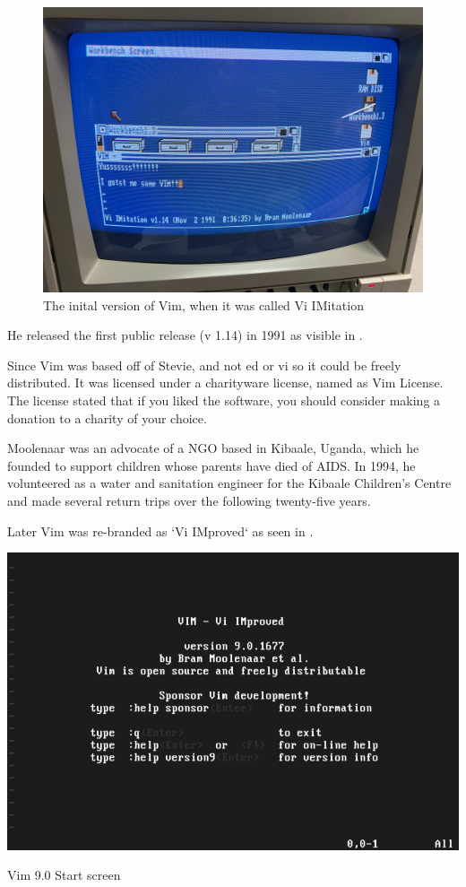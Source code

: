 \begin{figure}[h!]
  \includegraphics[width=0.8\linewidth]{images/png/vim-amiga.png}
  \caption{The inital version of Vim, when it was called Vi IMitation}
\end{figure}

He released the first public release (v 1.14) in 1991
as visible in .

Since Vim was based off of Stevie, and not ed or vi
so it could be freely distributed.
It was licensed under a charityware license,
named as Vim License.
The license stated that if you liked the software,
you should consider making a donation to a charity
of your choice.

Moolenaar was an advocate of a NGO based in Kibaale, Uganda,
which he founded to support children whose parents have died of AIDS.
In 1994, he volunteered as a water and sanitation engineer for the
Kibaale Children's Centre and made several return trips
over the following twenty-five years.

Later Vim was re-branded as `Vi IMproved`
as seen in .

\begin{marginfigure}
  \includegraphics{images/png/vim.png}
  \caption{Vim 9.0 Start screen}
\end{marginfigure}

